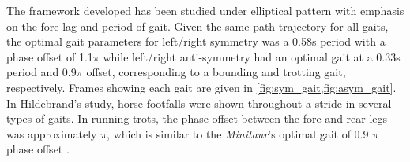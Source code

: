 \documentclass[conference,11pt,letterpaper]{IEEEtran}
\begin{document}




The framework developed has been studied under elliptical pattern with emphasis on the fore lag and period of gait. Given the same path trajectory for all gaits, the optimal gait parameters for left/right symmetry was a 0.58s period with a phase offset of 1.1$\pi$ while left/right anti-symmetry had an optimal gait at a 0.33s period and 0.9$\pi$ offset, corresponding to a bounding and trotting gait, respectively. Frames showing each gait are given in \cref{fig:sym_gait,fig:asym_gait}. In Hildebrand's study, horse footfalls were shown throughout a stride in several types of gaits. In running trots, the phase offset between the fore and rear legs was approximately $\pi$, which is similar to the \emph{Minitaur}'s optimal gait of 0.9 $\pi$ phase offset \autocite{Hildebrand701}. 
\end{document}
